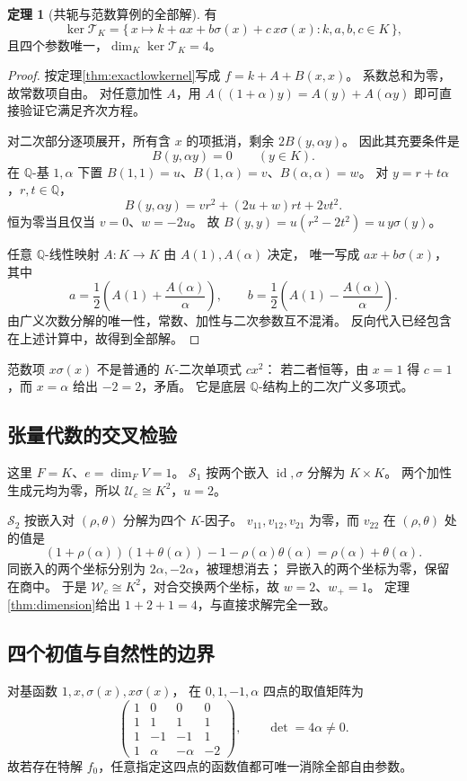 \documentclass[UTF8,11pt,a4paper]{ctexart}
\theoremstyle{definition}
\newtheorem{theorem}{定理}[section]
\newcommand{\Q}{\mathbb Q}
\newcommand{\id}{\operatorname{id}}
\newcommand{\T}{\mathcal T}
\newcommand{\Uc}{\mathscr U_c}
\newcommand{\Wc}{\mathscr W_c}
\numberwithin{equation}{section}
\begin{document}
\begin{theorem}[共轭与范数算例的全部解]\label{thm:normkernel}
有
\[
 \ker\T_K
 =\{\,x\mapsto k+ax+b\sigma(x)+c\,x\sigma(x):
 k,a,b,c\in K\,\},
\]
且四个参数唯一，$\dim_K\ker\T_K=4$。
\end{theorem}
\begin{proof}
按定理\ref{thm:exactlowkernel}写成 $f=k+A+B(x,x)$。
系数总和为零，故常数项自由。
对任意加性 $A$，用
$A((1+\alpha)y)=A(y)+A(\alpha y)$
即可直接验证它满足齐次方程。

对二次部分逐项展开，所有含 $x$ 的项抵消，剩余
$2B(y,\alpha y)$。
因此其充要条件是
\[
 B(y,\alpha y)=0\qquad(y\in K).
\]
在 $\Q$-基 $1,\alpha$ 下置
$B(1,1)=u$、$B(1,\alpha)=v$、$B(\alpha,\alpha)=w$。
对 $y=r+t\alpha$，$r,t\in\Q$，
\[
 B(y,\alpha y)=v r^2+(2u+w)rt+2v t^2.
\]
恒为零当且仅当 $v=0$、$w=-2u$。
故 $B(y,y)=u(r^2-2t^2)=u\,y\sigma(y)$。

任意 $\Q$-线性映射 $A:K\to K$ 由 $A(1),A(\alpha)$ 决定，
唯一写成 $ax+b\sigma(x)$，其中
\[
 a=\frac12\left(A(1)+\frac{A(\alpha)}{\alpha}\right),\qquad
 b=\frac12\left(A(1)-\frac{A(\alpha)}{\alpha}\right).
\]
由广义次数分解的唯一性，常数、加性与二次参数互不混淆。
反向代入已经包含在上述计算中，故得到全部解。
\end{proof}

范数项 $x\sigma(x)$ 不是普通的 $K$-二次单项式 $cx^2$：
若二者恒等，由 $x=1$ 得 $c=1$，而 $x=\alpha$ 给出 $-2=2$，矛盾。
它是底层 $\Q$-结构上的二次广义多项式。

\subsection{张量代数的交叉检验}
这里 $F=K$、$e=\dim_FV=1$。
$\mathscr S_1$ 按两个嵌入 $\id,\sigma$ 分解为 $K\times K$。
两个加性生成元均为零，所以 $\Uc\cong K^2$，$u=2$。

$\mathscr S_2$ 按嵌入对 $(\rho,\theta)$ 分解为四个 $K$-因子。
$v_{11},v_{12},v_{21}$ 为零，而 $v_{22}$ 在 $(\rho,\theta)$ 处的值是
\[
 (1+\rho(\alpha))(1+\theta(\alpha))
 -1-\rho(\alpha)\theta(\alpha)
 =\rho(\alpha)+\theta(\alpha).
\]
同嵌入的两个坐标分别为 $2\alpha,-2\alpha$，被理想消去；
异嵌入的两个坐标为零，保留在商中。
于是 $\Wc\cong K^2$，对合交换两个坐标，故 $w=2$、$w_+=1$。
定理\ref{thm:dimension}给出
$1+2+1=4$，与直接求解完全一致。

\subsection{四个初值与自然性的边界}
对基函数 $1,x,\sigma(x),x\sigma(x)$，
在 $0,1,-1,\alpha$ 四点的取值矩阵为
\[
 \begin{pmatrix}
 1&0&0&0\\
 1&1&1&1\\
 1&-1&-1&1\\
 1&\alpha&-\alpha&-2
 \end{pmatrix},
 \qquad\det=4\alpha\ne0.
\]
故若存在特解 $f_0$，任意指定这四点的函数值都可唯一消除全部自由参数。
\end{document}

